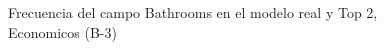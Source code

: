 \begin{figure}[H]
    \centering
    
    \caption{Frecuencia del campo Bathrooms en el modelo real y Top 2, Economicos (B-3)}
    \label{frecuency-Bathrooms-top2}
\end{figure}